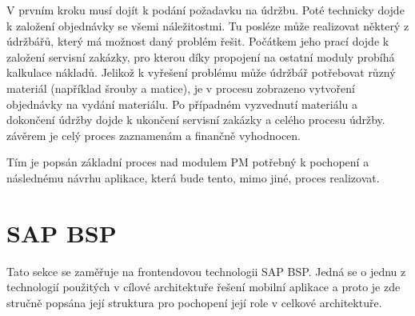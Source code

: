 \documentclass[thesis=M,czech]{FITthesis}[2012/06/26]
\begin{document}
V prvním kroku musí dojít k podání požadavku na údržbu. Poté technicky dojde k založení objednávky se všemi náležitostmi. Tu posléze může realizovat některý z údržbářů, který má možnost daný problém řešit. Počátkem jeho prací dojde k založení servisní zakázky, pro kterou díky propojení na ostatní moduly probíhá kalkulace nákladů. Jelikož k vyřešení problému může údržbář potřebovat různý materiál (například šrouby a matice), je v procesu zobrazeno vytvoření objednávky na vydání materiálu. Po případném vyzvednutí materiálu a dokončení údržby dojde k ukončení servisní zakázky a celého procesu údržby. závěrem je celý proces zaznamenám a finančně vyhodnocen.

Tím je popsán základní proces nad modulem PM potřebný k pochopení a následnému návrhu aplikace, která bude tento, mimo jiné, proces realizovat.

\section{SAP BSP}
Tato sekce se zaměřuje na frontendovou technologii SAP BSP. Jedná se o jednu z technologií použitých v cílové architektuře řešení mobilní aplikace a proto je zde stručně popsána její struktura pro pochopení její role v celkové architektuře. 
\end{document}
